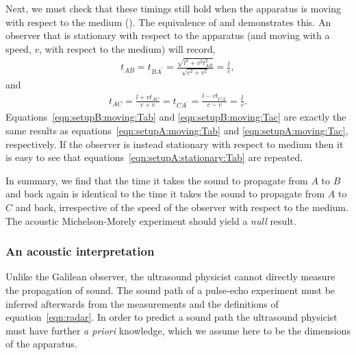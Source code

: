 Next, we must check that these timings still hold when the apparatus is moving with respect to the medium ().
The equivalence of  and  demonstrates this.
An observer that is stationary with respect to the apparatus (and moving with a speed, $v$, with respect to the medium) will record,
\begin{align}
  \label{eqn:setupB:moving:Tab}
  t_{AB} = t_{BA^\prime} =  \frac{\sqrt{l^2+v^2t_{AB}^2}}{\sqrt{c^2 +v^2}} = \frac{l}{c},
\end{align}
and 
\begin{align}
  \label{eqn:setupB:moving:Tac}
  t_{AC} =  \frac{l+vt_{AC}}{c+v}= t_{CA^\prime} =  \frac{l-vt_{CA^\prime}}{c-v}= \frac{l}{c}.
\end{align}
Equations~\ref{eqn:setupB:moving:Tab} and \ref{eqn:setupB:moving:Tac}  are exactly the same results as equations~\ref{eqn:setupA:moving:Tab} and \ref{eqn:setupA:moving:Tac},
respectively.
If the observer is instead stationary with respect to medium then it is easy to see that equations~\ref{eqn:setupA:stationary:Tab}  are repeated.

In summary, we find that the time it takes the sound to propagate from $A$ to $B$ and back again is
identical to the time it takes the sound to propagate from $A$ to $C$ and back,
irrespective of the speed of the observer with respect to the medium.
The acoustic Michelson-Morely experiment should yield a  {\em null} result.

\subsubsection{An acoustic interpretation}\label{sec:MMLorentzian}

Unlike the Galilean observer, the ultrasound physicist cannot directly measure the propagation of sound.
The sound path of a pulse-echo experiment must be inferred afterwards from the measurements and the  definitions of equation~\ref{eqn:radar}.
In order to  predict a  sound path the ultrasound physicist must have further {\em a priori}  knowledge,
which we assume here to be the dimensions  of the apparatus.


